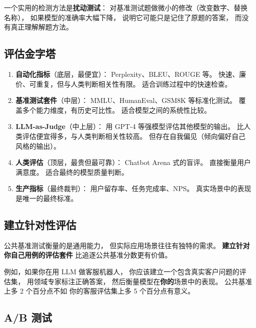 一个实用的检测方法是\textbf{扰动测试}：
对基准测试题做微小的修改（改变数字、替换名称），
如果模型的准确率大幅下降，
说明它可能只是记住了原题的答案，
而没有真正理解解题方法。

\subsection{评估金字塔}

\begin{corebox}
\begin{enumerate}[noitemsep]
  \item \textbf{自动化指标}（底层，最便宜）：
        Perplexity、BLEU、ROUGE 等。
        快速、廉价、可重复，但与人类判断相关性有限。
        适合训练过程中的快速检查。
  \item \textbf{基准测试套件}（中层）：
        MMLU、HumanEval、GSM8K 等标准化测试。
        覆盖多个能力维度，有历史可比性。
        适合模型之间的系统性比较。
  \item \textbf{LLM-as-Judge}（中上层）：
        用 GPT-4 等强模型评估其他模型的输出。
        比人类评估便宜得多，与人类判断相关性较高。
        但存在自我偏见（倾向偏好自己风格的输出）。
  \item \textbf{人类评估}（顶层，最贵但最可靠）：
        Chatbot Arena 式的盲评。
        直接衡量用户满意度。
        适合最终的模型质量判断。
  \item \textbf{生产指标}（最终裁判）：
        用户留存率、任务完成率、NPS。
        真实场景中的表现是唯一的最终标准。
\end{enumerate}
\end{corebox}

\subsection{建立针对性评估}

公共基准测试衡量的是通用能力，
但实际应用场景往往有独特的需求。
\textbf{建立针对你自己用例的评估套件}
比追逐公共基准分数更有价值。

例如，如果你在用 LLM 做客服机器人，
你应该建立一个包含真实客户问题的评估集，
用领域专家标注正确答案，
然后衡量模型在\textbf{你的}场景中的表现。
公共基准上多 2 个百分点不如
你的客服评估集上多 5 个百分点有意义。

\subsection{A/B 测试}

